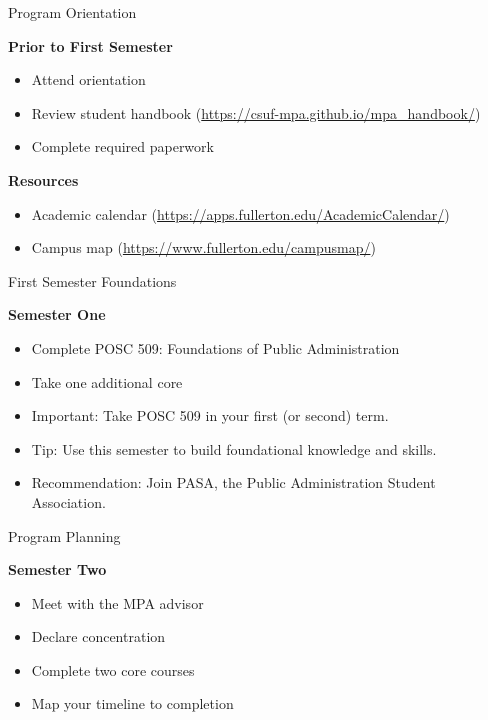 \documentclass[10pt]{beamer}
\begin{document}
\begin{frame}{Program Orientation}
\begin{Large}
\textbf{Prior to First Semester}
\begin{itemize}
  \item Attend orientation
  \item Review student handbook \small(\url{https://csuf-mpa.github.io/mpa_handbook/})
  \item Complete required paperwork
\end{itemize}
\textbf{Resources}
\begin{itemize}
  \item Academic calendar \small(\url{https://apps.fullerton.edu/AcademicCalendar/})
  \item Campus map \small(\url{https://www.fullerton.edu/campusmap/})
\end{itemize}
\end{Large}
\end{frame}

\begin{frame}{First Semester Foundations}
\begin{Large}
\textbf{Semester One}
\begin{itemize}
  \item Complete POSC 509: Foundations of Public Administration
  \item Take one additional core
\end{itemize}
\begin{itemize}
  \item \alert{Important:} Take POSC 509 in your first (or second) term.
  \item \alert{Tip:} Use this semester to build foundational knowledge and skills.
  \item \alert{Recommendation:} Join PASA, the Public Administration Student Association.
\end{itemize}
\end{Large}
\end{frame}

\begin{frame}{Program Planning}
\begin{Large}
\textbf{Semester Two}
\begin{itemize}
  \item Meet with the MPA advisor
  \item Declare concentration
  \item Complete two core courses
  \item Map your timeline to completion
\end{itemize}
\end{Large}
\end{frame}
\end{document}
